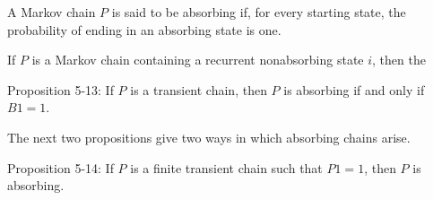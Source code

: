 A Markov chain $P$ is said to be absorbing if, for every starting state, the probability of ending in an absorbing state is one.

If $P$ is a Markov chain containing a recurrent nonabsorbing state $i$, then the

Proposition 5-13: If $P$ is a transient chain, then $P$ is absorbing if and only if $B1 = 1$.

The next two propositions give two ways in which absorbing chains arise.

Proposition 5-14: If $P$ is a finite transient chain such that $P1 = 1$, then $P$ is absorbing.

